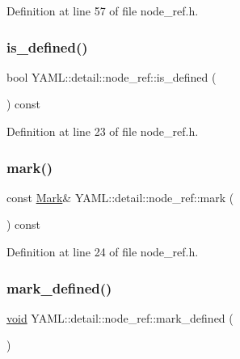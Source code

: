 Definition at line 57 of file node\+\_\+ref.\+h.

\mbox{\label{class_y_a_m_l_1_1detail_1_1node__ref_aaf84b14333ff431a4d6d0f5acaa4ed0d}} 
\subsubsection{\texorpdfstring{is\_defined()}{is\_defined()}}
{\footnotesize\ttfamily bool Y\+A\+M\+L\+::detail\+::node\+\_\+ref\+::is\+\_\+defined (\begin{DoxyParamCaption}{ }\end{DoxyParamCaption}) const\hspace{0.3cm}{\ttfamily [inline]}}



Definition at line 23 of file node\+\_\+ref.\+h.

\mbox{\label{class_y_a_m_l_1_1detail_1_1node__ref_abe162fcbe772cb38bd360aa7c066f241}} 
\subsubsection{\texorpdfstring{mark()}{mark()}}
{\footnotesize\ttfamily const \mbox{\hyperlink{struct_y_a_m_l_1_1_mark}{Mark}}\& Y\+A\+M\+L\+::detail\+::node\+\_\+ref\+::mark (\begin{DoxyParamCaption}{ }\end{DoxyParamCaption}) const\hspace{0.3cm}{\ttfamily [inline]}}



Definition at line 24 of file node\+\_\+ref.\+h.

\mbox{\label{class_y_a_m_l_1_1detail_1_1node__ref_ac404772f3c816d0105c88ecf8ea74417}} 
\subsubsection{\texorpdfstring{mark\_defined()}{mark\_defined()}}
{\footnotesize\ttfamily \mbox{\hyperlink{glad_8h_a950fc91edb4504f62f1c577bf4727c29}{void}} Y\+A\+M\+L\+::detail\+::node\+\_\+ref\+::mark\+\_\+defined (\begin{DoxyParamCaption}{ }\end{DoxyParamCaption})\hspace{0.3cm}{\ttfamily [inline]}}



